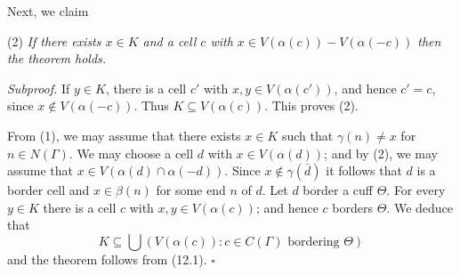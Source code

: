 Next, we claim

\hspace*{12pt}(2) \textit{If there exists $x \in K$ and a cell $c$ with $x \in V(\alpha(c)) - V(\alpha(-c))$ then the theorem holds.}

\textit{Subproof.} If $y \in K$, there is a cell $c'$ with $x, y \in V(\alpha(c'))$, and hence $c' = c$, since $x \notin V(\alpha(-c))$. Thus $K \subseteq V(\alpha(c))$. This proves (2).

From (1), we may assume that there exists $x \in K$ such that $\gamma(n) \ne x$ for $n \in N(\Gamma)$. We may choose a cell $d$ with $x \in V(\alpha(d))$; and by (2), we may assume that $x \in V(\alpha(d) \cap \alpha(-d))$. Since $x \notin \gamma(\bar{d})$ it follows that $d$ is a border cell and $x \in \beta(n)$ for some end $n$ of $d$. Let $d$ border a cuff $\Theta$. For every $y \in K$ there is a cell $c$ with $x, y \in V(\alpha(c))$; and hence $c$ borders $\Theta$. We deduce that
\begin{equation*}
K \subseteq \bigcup (V(\alpha(c)) \colon c \in C(\Gamma) \text{ bordering } \Theta)
\end{equation*}
and the theorem follows from (12.1). $\square$
